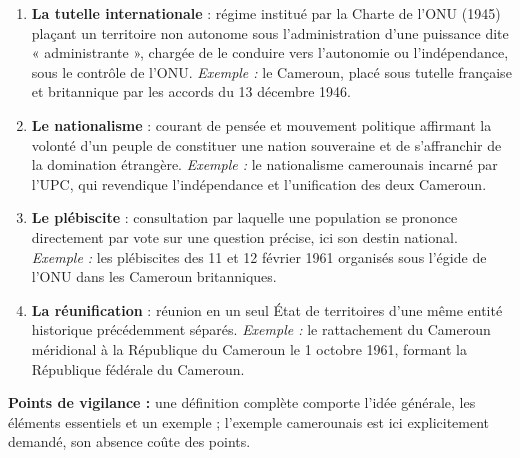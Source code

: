 \documentclass[11pt]{article}
\begin{document}
\begin{corrige}
\begin{enumerate}
\item \textbf{La tutelle internationale} : régime institué par la Charte de l'ONU (1945) plaçant un territoire non autonome sous l'administration d'une puissance dite « administrante », chargée de le conduire vers l'autonomie ou l'indépendance, sous le contrôle de l'ONU. \emph{Exemple :} le Cameroun, placé sous tutelle française et britannique par les accords du 13 décembre 1946.
\item \textbf{Le nationalisme} : courant de pensée et mouvement politique affirmant la volonté d'un peuple de constituer une nation souveraine et de s'affranchir de la domination étrangère. \emph{Exemple :} le nationalisme camerounais incarné par l'UPC, qui revendique l'indépendance et l'unification des deux Cameroun.
\item \textbf{Le plébiscite} : consultation par laquelle une population se prononce directement par vote sur une question précise, ici son destin national. \emph{Exemple :} les plébiscites des 11 et 12 février 1961 organisés sous l'égide de l'ONU dans les Cameroun britanniques.
\item \textbf{La réunification} : réunion en un seul État de territoires d'une même entité historique précédemment séparés. \emph{Exemple :} le rattachement du Cameroun méridional à la République du Cameroun le 1\ier{} octobre 1961, formant la République fédérale du Cameroun.
\end{enumerate}
\textbf{Points de vigilance :} une définition complète comporte l'idée générale, les éléments essentiels et un exemple ; l'exemple camerounais est ici explicitement demandé, son absence coûte des points.
\end{corrige}
\end{document}
